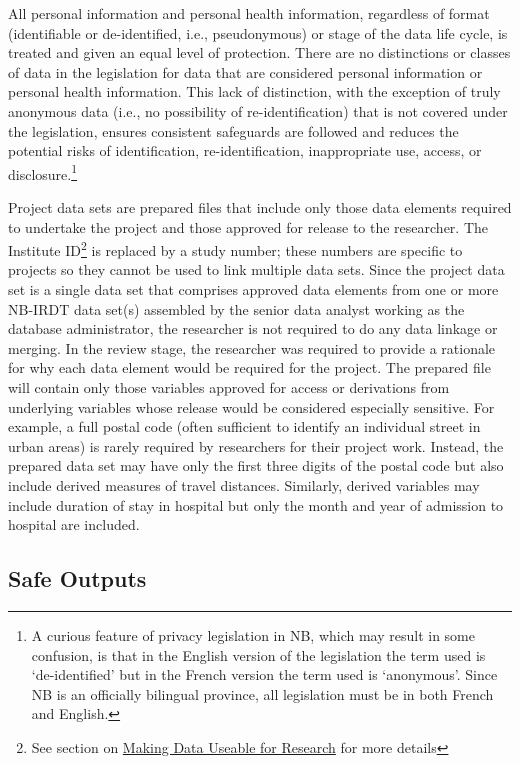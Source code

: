 All personal information and personal health information, regardless of format (identifiable or de-identified, i.e., pseudonymous) or stage of the data life cycle, is treated and given an equal level of protection. There are no distinctions or classes of data in the legislation for data that are considered personal information or personal health information. This lack of distinction, with the exception of truly anonymous data (i.e., no possibility of re-identification) that is not covered under the legislation, ensures consistent safeguards are followed and reduces the potential risks of identification, re-identification, inappropriate use, access, or disclosure.\footnote{A curious feature of privacy legislation in NB, which may result in some confusion, is that in the English version of the legislation the term used is `de-identified' but in the French version the term used is `anonymous'. Since NB is an officially bilingual province, all legislation must be in both French and English.}

Project data sets are prepared files that include only those data elements required to undertake the project and those approved for release to the researcher. The Institute ID\footnote{See section on \protect\hyperlink{nbirdt-making}{Making Data Useable for Research} for more details} is replaced by a study number; these numbers are specific to projects so they cannot be used to link multiple data sets. Since the project data set is a single data set that comprises approved data elements from one or more NB-IRDT data set(s) assembled by the senior data analyst working as the database administrator, the researcher is not required to do any data linkage or merging. In the review stage, the researcher was required to provide a rationale for why each data element would be required for the project. The prepared file will contain only those variables approved for access or derivations from underlying variables whose release would be considered especially sensitive. For example, a full postal code (often sufficient to identify an individual street in urban areas) is rarely required by researchers for their project work. Instead, the prepared data set may have only the first three digits of the postal code but also include derived measures of travel distances. Similarly, derived variables may include duration of stay in hospital but only the month and year of admission to hospital are included.

\hypertarget{nbirdt-safeoutput}{%
\subsection{Safe Outputs}\label{nbirdt-safeoutput}}

